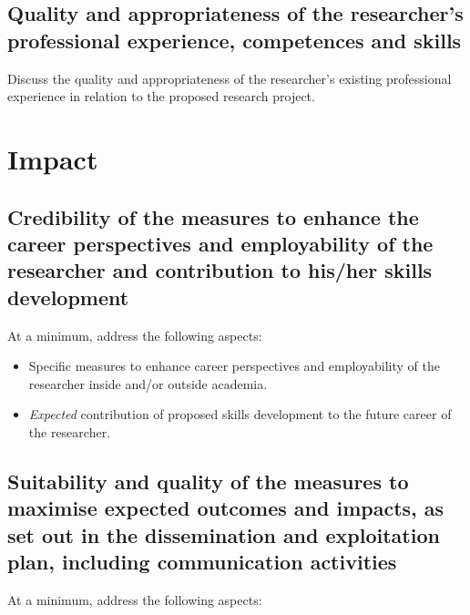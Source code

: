 \documentclass[11pt,draftproposal]{msca-pf}
\begin{document}
\subsection{Quality and appropriateness of the researcher's professional
experience, competences and skills}
\label{ssc:excellence:researcher}

Discuss the quality and appropriateness of the researcher’s existing professional
experience in relation to the proposed research project.

\section{Impact }
\label{sc:impact}

\subsection{Credibility of the measures to enhance the career perspectives
and employability of the researcher and contribution to his/her skills
development}
\label{ssc:impact:career}

At a minimum, address the following aspects:

\begin{itemize}
    \item Specific measures to enhance career perspectives and employability of
    the researcher inside and/or outside academia.
    \item \emph{Expected} contribution of proposed skills development to the
    future career of the researcher.
\end{itemize}

\subsection{Suitability and quality of the measures to maximise expected
outcomes and impacts, as set out in the dissemination and exploitation plan,
including communication activities }
\label{ssc:impact:outcomes}

At a minimum, address the following aspects:
\end{document}
